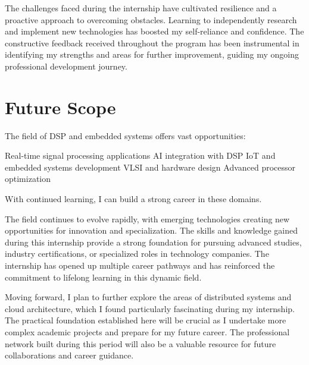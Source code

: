 \documentclass[12pt,a4paper]{report}
\begin{document}
The challenges faced during the internship have cultivated resilience and a proactive approach to overcoming obstacles. Learning to independently research and implement new technologies has boosted my self-reliance and confidence. The constructive feedback received throughout the program has been instrumental in identifying my strengths and areas for further improvement, guiding my ongoing professional development journey.


\section{Future Scope}

The field of DSP and embedded systems offers vast opportunities:


Real-time signal processing applications AI integration with DSP IoT and embedded systems development VLSI and hardware design Advanced processor optimization


With continued learning, I can build a strong career in these domains.


The field continues to evolve rapidly, with emerging technologies creating new opportunities for innovation and specialization. The skills and knowledge gained during this internship provide a strong foundation for pursuing advanced studies, industry certifications, or specialized roles in technology companies. The internship has opened up multiple career pathways and has reinforced the commitment to lifelong learning in this dynamic field.


Moving forward, I plan to further explore the areas of distributed systems and cloud architecture, which I found particularly fascinating during my internship. The practical foundation established here will be crucial as I undertake more complex academic projects and prepare for my future career. The professional network built during this period will also be a valuable resource for future collaborations and career guidance.
\end{document}
